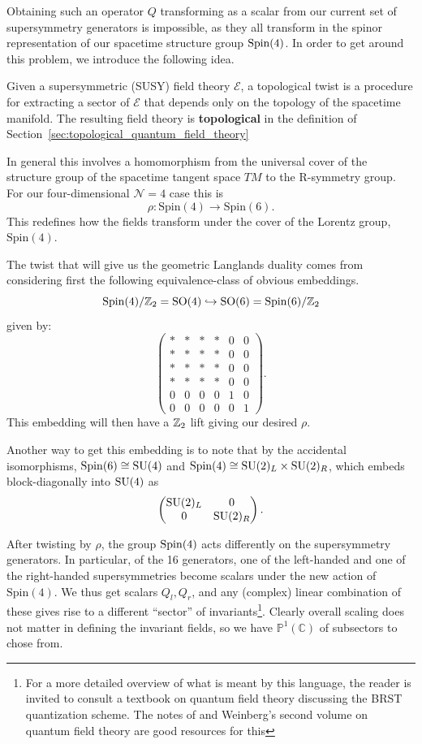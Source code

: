 	Obtaining such an operator $Q$ transforming as a scalar from our current set of supersymmetry generators is impossible, as they all transform in the spinor representation of our spacetime structure group $\mathrm{Spin}(4)$. In order to get around this problem, we introduce the following idea. 
	
	\begin{phys}
		Given a supersymmetric (SUSY) field theory $\mathcal E$, a topological twist is a procedure for extracting a sector of $\mathcal E$ that depends only on the topology of the spacetime manifold. The resulting field theory is \textbf{topological} in the definition of Section~\ref{sec:topological_quantum_field_theory}
	\end{phys}
	In general this involves a homomorphism from the universal cover of the structure group of the spacetime tangent space $TM$ to the R-symmetry group. For our four-dimensional $\mathcal N = 4$ case this is
	$$\rho : \mathrm{Spin}(4) \to \mathrm{Spin}(6).$$
	This redefines how the fields transform under the cover of the Lorentz group, $\mathrm{Spin}(4)$. 
	
	The twist that will give us the geometric Langlands duality comes from considering first the following equivalence-class of obvious embeddings.
	$$\mathrm{Spin}(4)/\mathbb{Z}_2 = \mathrm{SO}(4) \hookrightarrow \mathrm{SO}(6) = \mathrm{Spin}(6)/\mathbb{Z}_2$$
	given by:
	\[
		\begin{pmatrix}
			* & * & * & * & 0 & 0 \\
			* & * & * & * & 0 & 0 \\
			* & * & * & * & 0 & 0 \\
			* & * & * & * & 0 & 0 \\
			0 & 0 & 0 & 0 & 1 & 0 \\
			0 & 0 & 0 & 0 & 0 & 1
		\end{pmatrix}.
	\]
	This embedding will then have a $\mathbb{Z}_2$ lift giving our desired $\rho$. 
	
	Another way to get this embedding is to note that by the accidental isomorphisms, $\mathrm{Spin}(6) \cong \mathrm{SU}(4)$ and $\mathrm{Spin}(4) \cong \mathrm{SU}(2)_L \times \mathrm{SU}(2)_R$, which embeds block-diagonally into $\mathrm{SU}(4)$ as
	\[
		\begin{pmatrix}
			\mathrm{SU}(2)_L & 0 \\
			0 & \mathrm{SU}(2)_R
		\end{pmatrix}.
	\]
	
	After twisting by $\rho$, the group $\mathrm{Spin}(4)$ acts differently on the supersymmetry generators. In particular, of the 16 generators, one of the left-handed and one of the right-handed supersymmetries become scalars under the new action of $\mathrm{Spin}(4)$. We thus get scalars $Q_l, Q_r$, and any (complex) linear combination of these gives rise to a different ``sector'' of invariants\footnote{For a more detailed overview of what is meant by this language, the reader is invited to consult a textbook on quantum field theory discussing the BRST quantization scheme. The notes of \cite{van2005aspects} and Weinberg's second volume on quantum field theory \cite{weinberg1995quantum} are good resources for this}. Clearly overall scaling does not matter in defining the invariant fields, so we have $\mathbb P^1 (\mathbb C)$ of subsectors to chose from.
	
